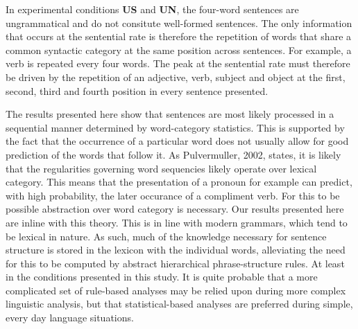 \documentclass[a4paper,10pt,twoside]{article}
\begin{document}
In experimental conditions \textbf{US} and \textbf{UN}, the four-word
sentences are ungrammatical and do not consitute well-formed
sentences. The only information that occurs at the sentential rate is
therefore the repetition of words that share a common syntactic
category at the same position across sentences. For example, a verb is
repeated every four words. The peak at the sentential rate must
therefore be driven by the repetition of an adjective, verb, subject
and object at the first, second, third and fourth position in every
sentence presented.
%
%
%
%
%
%
%
%

The results presented here show that sentences are most likely
processed in a sequential manner determined by word-category
statistics. 
%
%
 This is supported by the fact that the occurrence of a
particular word does not usually allow for good prediction of the
words that follow it. As Pulvermuller, 2002, states, it is likely that
the regularities governing word sequencies likely operate over lexical
category. This means that the presentation of a pronoun for example
can predict, with high probability, the later occurance of a
compliment verb. For this to be possible abstraction over word category is
necessary. Our results presented here are inline with this
theory. 
%
%
This is in line with modern grammars, which tend to be lexical in
nature. As such, much of the knowledge necessary for sentence
structure is stored in the lexicon with the individual words,
alleviating the need for this to be computed by abstract hierarchical
phrase-structure rules. At least in the conditions presented in this
study. It is quite probable that a more complicated set of rule-based
analyses may be relied upon during more complex linguistic analysis,
but that statistical-based analyses are preferred during simple, every
day language situations. 
\end{document}
